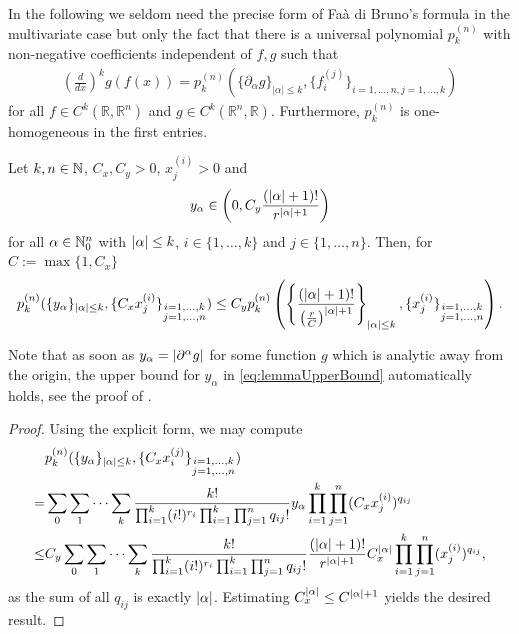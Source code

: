 In the following we seldom need the precise form of Faà di Bruno's formula in the multivariate case but only the fact that there is a universal polynomial $p_k^{(n)}$ with non-negative coefficients independent of $f,g$ such that 
\begin{align}\label{universalpoly}
\left(\tfrac{d}{dx}\right)^k g(f(x)) = p_k^{(n)} (\{\partial_\alpha g\}_{|\alpha|\leq k}, \{ f^{(j)}_i\}_{i=1, \ldots, n, j=1, \ldots, k} )
\end{align}
for all $f \in C ^k (\mathbb R, \mathbb R ^n)$ and $g \in C^k(\mathbb R ^n, \mathbb R).$ Furthermore, $p_k^{(n)}$ is one-homogeneous in the first entries.

\begin{lemma}
	\label{lemma:estimateAnalyticFaaDiBruno}
	Let $k,n \in \mathbb{N}$, $C_x,C_y>0$, $x_j^{(i)}>0$ and 
	\begin{align}\label{eq:lemmaUpperBound}
	y_\alpha \in \left(0,C_y \frac {(\lvert\alpha\rvert +1)!} {r^{\lvert\alpha\rvert +1}}\right)
	\end{align}
	for all $\alpha \in \mathbb{N}_0^n$ with $\lvert\alpha\rvert \le k$, $i \in \{1,\ldots,k\}$ and $j \in \{1,\ldots,n\}$.
	Then, for $C:=\max\{1,C_x\}$
	\[
	p_k^{(n)}(\{y_\alpha\}_{\lvert\alpha\rvert\le k}, \{C_x x_j^{(i)}\}_{\substack{i = 1, \ldots, k\\j =1, \ldots, n}})
	\le C_y p_k^{(n)}\left(\left\{\frac {(\lvert\alpha\rvert +1)!} {\left(\frac r C\right)^{\lvert\alpha\rvert +1}}\right\}_{\lvert\alpha\rvert\le k}, \{x_j^{(i)}\}_{\substack{i = 1, \ldots, k\\j =1, \ldots, n}}\right).
	\]
\end{lemma}
Note that as soon as $y_\alpha = \lvert\partial^\alpha g\rvert$ for some function $g$ which is analytic away from the origin, the upper bound for $y_\alpha$ in \eqref{eq:lemmaUpperBound} automatically holds, see the proof of \cite[Theorem 7.2]{BlattVorderobermeier:2019:CriticalMoebius}.
\begin{proof}
	Using the explicit form, we may compute
	\[
	\begin{split}
	&p_k^{(n)}(\{y_\alpha\}_{\lvert\alpha\rvert\le k}, \{C_x x_i^{(j)}\}_{\substack{i = 1, \ldots, k\\j =1, \ldots, n}})\\
	=&\sum_0 \sum_1 \cdots \sum_k  \frac{k!}{\prod_{i=1}^k (i!)^{r_i} \prod_{i=1}^k\prod_{j=1}^nq_{ij}! }  y_\alpha \prod_{i=1}^k \prod_{j=1}^n (C_x x_j^{(i)})^{q_{ij}}\\
	\le& C_y \sum_0 \sum_1 \cdots \sum_k  \frac{k!}{\prod_{i=1}^k (i!)^{r_i} \prod_{i=1}^k\prod_{j=1}^nq_{ij}!} \frac {(\lvert\alpha\rvert +1)!} {r^{\lvert\alpha\rvert +1}} C_x^{\lvert\alpha\rvert} \prod_{i=1}^k \prod_{j=1}^n (x_j^{(i)})^{q_{ij}},
	\end{split}
	\]
	as the sum of all $q_{ij}$ is exactly $\lvert\alpha\rvert$.
	Estimating $C_x^{\lvert\alpha\rvert} \le C^{\lvert\alpha\rvert +1}$ yields the desired result.
\end{proof}

